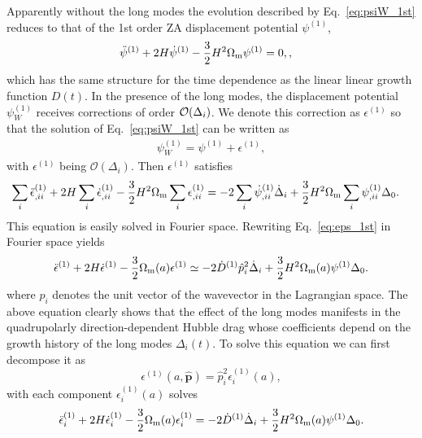 \documentclass[a4paper,11pt]{article}
\newcommand{\vp}{{\bm p}}
\begin{document}
Apparently without the long modes the evolution described by Eq.~\eqref{eq:psiW_1st} reduces to
that of the 1st order ZA displacement potential $\psi^{(1)}$,
\begin{align}
    \ddot{\psi}^{(1)} + 2H\dot{\psi}^{(1)} - \frac{3}{2}H^2\Omega_{\rm m}\psi^{(1)} &= 0,
    \label{eq:psi_1st},
\end{align}
which has the same structure for the time dependence as the linear linear growth function $D(t)$.
In the presence of the long modes, the displacement potential $\psi^{(1)}_W$
receives corrections of order ${\cal O}(\Delta_i)$.
We denote this correction as $\epsilon^{(1)}$ so that the solution of Eq.~\eqref{eq:psiW_1st} can be written as
\begin{align}
\psi_{W}^{(1)} = \psi^{(1)} + \epsilon^{(1)},
\end{align}
with $\epsilon^{(1)}$ being $\mathcal{O}(\Delta_i)$.
Then $\epsilon^{(1)}$ satisfies
\begin{align}
    \sum_i \ddot{\epsilon}^{(1)}_{,ii} + 2H\sum_i \dot{\epsilon}^{(1)}_{,ii} - \frac{3}{2}H^2\Omega_{\rm m}\sum_i \epsilon^{(1)}_{,ii} &= -2\sum_i \dot{\psi}_{,ii}^{(1)}\dot{\Delta}_i
    + \frac{3}{2}H^2\Omega_{\rm m}\sum_i \psi_{,ii}^{(1)}\Delta_0.
    \label{eq:eps_1st}
\end{align}
This equation is easily solved in Fourier space.
Rewriting Eq.~\eqref{eq:eps_1st} in Fourier space yields
\begin{equation}
    \ddot \epsilon^{(1)} +2H \dot \epsilon^{(1)}
    - \frac32 \Omega_{\rm m}(a) \epsilon^{(1)}
    \simeq
    - 2\dot D^{(1)} \hat p_i^2 \dot \Delta_i + \frac32 H^2 \Omega_{\rm m}(a) \psi^{(1)} \Delta_0.
\end{equation}
where $\hat p_i$ denotes the unit vector of the wavevector
in the Lagrangian space.
The above equation clearly shows that the effect of the long modes manifests in the quadrupolarly
direction-dependent Hubble drag whose coefficients depend on the growth
history of the long modes $\Delta_i(t)$.
To solve this equation we can first decompose it as
\begin{equation}
    \epsilon^{(1)}(a, \hat{\vp}) = \hat p_i^2 \epsilon^{(1)}_i(a),
    \label{e}
\end{equation}
with each component $\epsilon^{(1)}_i(a)$ solves
\begin{equation}
    \ddot \epsilon_i^{(1)} + 2H \dot \epsilon_i^{(1)}
    - \frac32 \Omega_{\rm m}(a)\epsilon_i^{(1)}
    = - 2 \dot D^{(1)} \dot \Delta_i + \frac32 H^2\Omega_{\rm m}(a) \psi^{(1)} \Delta_0.
    \label{eq:ei}
\end{equation}
\end{document}
